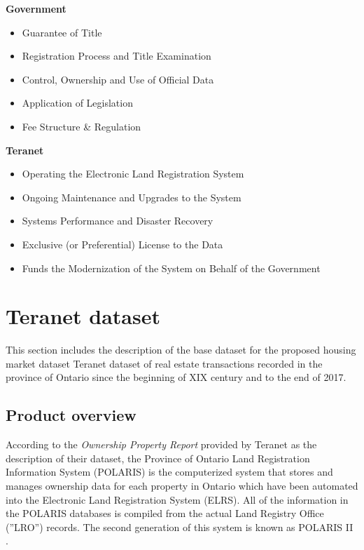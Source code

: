\documentclass[11pt]{article}
\begin{document}
    \textbf{Government}

    \begin{itemize}
        \item Guarantee of Title
        \item Registration Process and Title Examination
        \item Control, Ownership and Use of Official Data
        \item Application of Legislation
        \item Fee Structure \& Regulation
    \end{itemize}

    \vspace{5mm}

    \newpage

    \textbf{Teranet}

    \begin{itemize}
        \item Operating the Electronic Land Registration System
        \item Ongoing Maintenance and Upgrades to the System
        \item Systems Performance and Disaster Recovery
        \item Exclusive (or Preferential) License to the Data
        \item Funds the Modernization of the System on Behalf of the Government
    \end{itemize}

    \section{Teranet dataset} \label{sec:teranet_dataset}

    This section includes the description of the base dataset for the proposed housing market dataset \textemdash Teranet dataset of real estate transactions recorded in the province of Ontario since the beginning of XIX century and to the end of 2017.

    \subsection{Product overview} \label{subsec:teranet_product_overview}

    According to the \textit{Ownership Property Report} provided by Teranet as the description of their dataset\cite{TeranetEnterprisesInc.2011}, the Province of Ontario Land Registration Information System (POLARIS) is the computerized system that stores and manages ownership data for each property in Ontario which have been automated into the Electronic Land Registration System (ELRS).
    All of the information in the POLARIS databases is compiled from the actual Land Registry Office (''LRO'') records.
    The second generation of this system is known as POLARIS II .
\end{document}
